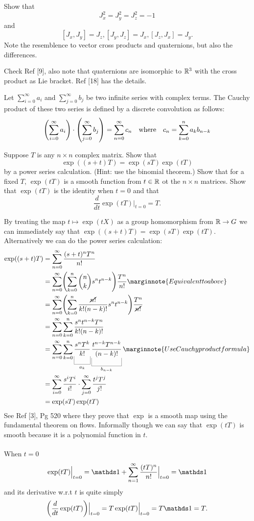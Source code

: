 \documentclass[10pt]{article}
\begin{document}
\begin{example}
	Show that
	$$
	J_x^2 = J_y^2 = J_z^2 = -1
	$$
	and
	$$
	[J_x,J_y] = J_z, [J_y,J_z] = J_x, [J_z,J_x] = J_y.
	$$
	Note the resemblence to vector cross products and quaternions, but also the differences.
\end{example}
\sol Check Ref [9], also note that quaternions are isomorphic to $\R^3$ with the cross product as Lie bracket. Ref [18] has the details.


\begin{definition}
	 Let $\sum_{i=0}^{\infty} a_i$ and $\sum_{j=0}^{\infty} b_j$ be two infinite series with complex terms. The Cauchy product of these two series is defined by a discrete convolution as follows:
	$$
	\p*{\sum_{i=0}^{\infty} a_i}\cdot\p*{\sum_{j=0}^{\infty} b_j} = \sum_{n=0}^{\infty}c_n\quad\text{where}\quad c_n = \sum_{k=0}^{n}a_kb_{n-k}
	$$
\end{definition}


\begin{example}
	Suppose $T$ is any $n \times n$ complex matrix. Show that
	$$
	\exp((s+t)T)=\exp(sT)\exp(tT)
	$$
	by a power series calculation. (Hint: use the binomial theorem.) Show that for a fixed $T$, $\exp(tT)$ is a smooth function from $t\in\R$ ot the $n \times n$ matrices. Show that $\exp(tT)$ is the identity when $t=0$ and that
	$$
	\frac{d}{dt}\exp(tT)\Big|_{t=0} = T.
	$$
\end{example}
\sol By treating the map $t \mapsto \exp(tX)$ as a group homomorphism from $\R \to G$ we can immediately say that $\exp((s+t)T)=\exp(sT)\exp(tT)$. Alternatively we can do the power series calculation:
$$
\begin{aligned}
	\exp((s+t)T) &= \sum_{n=0}^{\infty}\frac{(s+t)^nT^n}{n!}\\
	&= \sum_{n=0}^{\infty}\p*{\sum_{k=0}^{n}{n\choose k}s^nt^{n-k}}\frac{T^n}{n!}\marginnote{Equivalent to above}\\
	&= \sum_{n=0}^{\infty}\p*{\sum_{k=0}^{n}\frac{\cancel{n!}}{k!(n-k)!}s^nt^{n-k}}\frac{T^n}{\cancel{n!}}\\
	&= \sum_{n=0}^{\infty}\sum_{k=0}^{n}\frac{s^nt^{n-k}T^n}{k!(n-k)!}\\
	&= \sum_{n=0}^{\infty}\sum_{k=0}^{n}\ub{\frac{s^nT^k}{k!}}{a_k}\ub{\frac{t^{n-k}T^{n-k}}{(n-k)!}}{b_{n-k}}\marginnote{Use Cauchy product formula}\\
	&= \sum_{i=0}^{\infty}\frac{s^iT^i}{i!} \cdot \sum_{j=0}^{\infty}\frac{t^jT^j}{j!}\\
	&=\exp(sT)\exp(tT)
\end{aligned}
$$
See Ref [3], Pg 520 where they prove that $\exp$ is a smooth map using the fundamental theorem on flows. Informally though we can say that $\exp(tT)$ is smooth because it is a polynomial function in $t$.\\\\
When $t=0$
$$
\exp(tT)\Big|_{t=0} = \id + \sum_{n=1}^{\infty} \frac{(tT)^n}{n!}\Big|_{t=0} = \id
$$
and its derivative w.r.t $t$ is quite simply
$$
\p*{\frac{d}{dt}\exp(tT)}\Big|_{t=0} = T\exp(tT)\Big|_{t=0} = T\id = T.
$$
\end{document}
